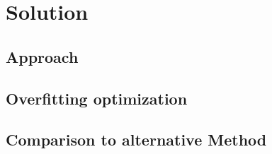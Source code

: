 \section{Solution}
\subsection{Approach}
    \label{sec:1}
\subsection{Overfitting optimization}
    \label{sec:2}
\subsection{Comparison to alternative Method}
    \label{sec:3}